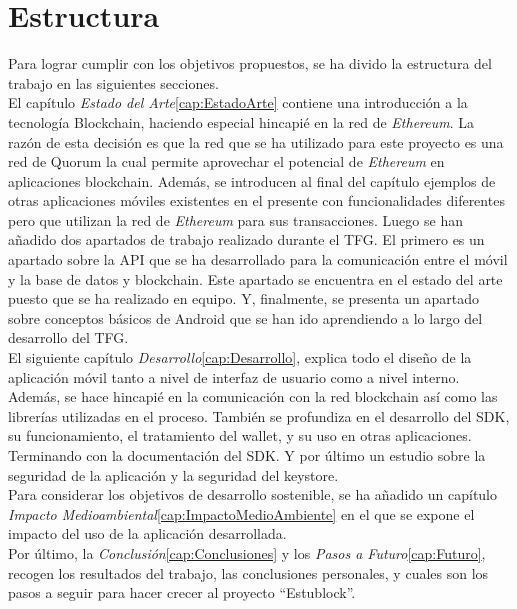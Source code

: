 \section{Estructura}
Para lograr cumplir con los objetivos propuestos, se ha divido la estructura del trabajo en las siguientes secciones. \\

El capítulo \emph{Estado del Arte}\ref{cap:EstadoArte} contiene una introducción a la tecnología Blockchain, haciendo especial hincapié en la red de \emph{Ethereum}\cite{webEthereum}. La razón de esta decisión es que la red que se ha utilizado para este proyecto es una red de Quorum\cite{webQuorum} la cual permite aprovechar el potencial de \emph{Ethereum} en aplicaciones blockchain. Además, se introducen al final del capítulo ejemplos de otras aplicaciones móviles existentes en el presente con funcionalidades diferentes pero que utilizan la red de \emph{Ethereum} para sus transacciones. Luego se han añadido dos apartados de trabajo realizado durante el TFG. El primero es un apartado sobre la API que se ha desarrollado para la comunicación entre el móvil y la base de datos y blockchain. Este apartado se encuentra en el estado del arte puesto que se ha realizado en equipo. Y, finalmente, se presenta un apartado sobre conceptos básicos de Android que se han ido aprendiendo a lo largo del desarrollo del TFG. \\

El siguiente capítulo \emph{Desarrollo}\ref{cap:Desarrollo}, explica todo el diseño de la aplicación móvil tanto a nivel de interfaz de usuario como a nivel interno. Además, se hace hincapié en la comunicación con la red blockchain así como las librerías utilizadas en el proceso. También se profundiza en el desarrollo del SDK, su funcionamiento, el tratamiento del wallet, y su uso en otras aplicaciones. Terminando con la documentación del SDK. Y por último un estudio sobre la seguridad de la aplicación y la seguridad del keystore. \\

Para considerar los objetivos de desarrollo sostenible, se ha añadido un capítulo \emph{Impacto Medioambiental}\ref{cap:ImpactoMedioAmbiente} en el que se expone el impacto del uso de la aplicación desarrollada. \\

Por último, la \emph{Conclusión}\ref{cap:Conclusiones} y los \emph{Pasos a Futuro}\ref{cap:Futuro}, recogen los resultados del trabajo, las conclusiones personales, y cuales son los pasos a seguir para hacer crecer al proyecto ``Estublock''.

